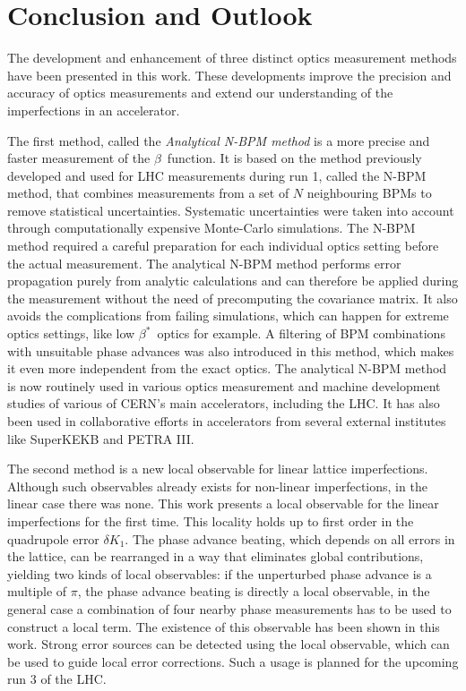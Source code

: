 \chapter{Conclusion and Outlook}

The development and enhancement of three distinct optics measurement methods have been presented in this work.
These developments improve the precision and accuracy of optics measurements and extend our understanding of the
imperfections in an accelerator.

The first method, called the \emph{Analytical N-BPM method} is a more precise and faster measurement of the $\beta$~function.
It is based on the method previously developed and used for LHC measurements during run 1, called the N-BPM method,
that combines measurements from a set of $N$ neighbouring BPMs to remove statistical uncertainties.
Systematic uncertainties were taken into account through computationally expensive Monte-Carlo simulations.
The N-BPM method required a careful preparation for each individual optics setting before the actual measurement.
The analytical N-BPM method performs error propagation purely from analytic calculations and can therefore be applied
during the measurement without the need of precomputing the covariance matrix.
It also avoids the complications from failing simulations, which can happen for extreme optics settings,
like low $\beta^*$~optics for example.
A filtering of BPM combinations with unsuitable phase advances was also introduced in this method, which makes it even
more independent from the exact optics.
The analytical N-BPM method is now routinely used in various optics measurement and machine development
studies of various of CERN's main accelerators, including the LHC.
It has also been used in collaborative
efforts in accelerators from several external institutes like SuperKEKB and PETRA III.

The second method is a new local observable for linear lattice imperfections.
Although such observables already exists for non-linear imperfections, in the linear case there was none.
This work presents a local observable for the linear imperfections for the first time. This locality holds up to first
order in the quadrupole error $\delta K_1$.
The phase advance beating, which depends on all errors in the lattice, can be rearranged in a way that eliminates
global contributions, yielding two kinds of local observables:
if the unperturbed phase advance is a multiple of $\pi$, the phase advance beating is directly a local observable,
in the general case a combination of four nearby phase measurements has to be used to construct a local term.
The existence of this observable has been shown in this work.
Strong error sources can be detected using the local observable, which can be used to guide local error corrections.
Such a usage is planned for the upcoming run 3 of the LHC.

